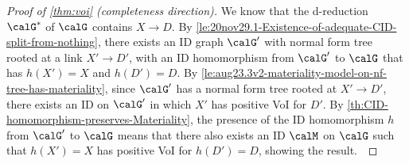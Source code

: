 






\begin{proof}[Proof of {\cref{thm:voi}} (completeness direction)]
We know that the d-reduction $\calG^*$ of $\calG$ contains $X \to D$.
By \cref{le:20nov29.1-Existence-of-adequate-CID-split-from-nothing}, there exists an ID graph $\calG'$ 
with normal form tree rooted at a link $X' \to D'$, with an ID homomorphism from $\calG'$ to $\calG$ that has $h(X')=X$ and $h(D')=D$. 
By \cref{le:aug23.3v2-materiality-model-on-nf-tree-has-materiality}, since $\calG'$ has a normal form tree rooted at $X'\to D'$, there exists an ID on $\calG'$ in which $X'$ has positive VoI for $D'$.
By \cref{th:CID-homomorphism-preserves-Materiality}, the presence of the ID homomorphism $h$ from $\calG'$ to $\calG$
means that there also exists an ID $\calM$ on $\calG$ such that $h(X')=X$ has positive VoI for $h(D')=D$, showing the result.~
\end{proof}